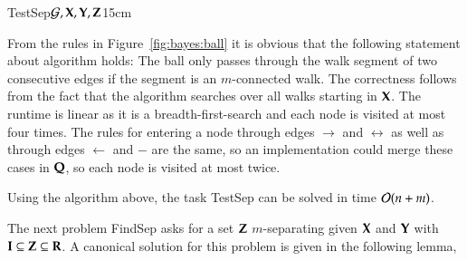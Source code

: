 \begin{algo}{TestSep}{${\cal G}, {\bf X}, {\bf Y}, {\bf Z}$}{\label{algo:issep}}{15cm}
\State{$\bQ \gets \bP$  }
\EndIf
\EndFor
{}
\EndIf
\EndWhile
{}
\end{algo}
\begin{analal}
From the rules in Figure~\ref{fig:bayes:ball} it is obvious that the following statement about algorithm  holds:
%
%
%
The ball only passes through the walk segment of two consecutive edges 
if the segment is an $m$-connected walk. The correctness follows from the fact that 
the algorithm searches over all walks starting in ${\bf X}$.
%
%
%
%
The runtime is linear as it is a breadth-first-search and each node is visited at most four times. The rules for entering a node through edges $\to$ and $\leftrightarrow$ as well as through edges $\gets$ and $-$ are the same, so an implementation could merge these cases in $ {\bf Q} $, so each node is visited at most twice. %
\end{analal}
\begin{proposition}\label{prop:TestSep}
Using the algorithm above, the task {\sc TestSep} can be solved in time ${\cal O}(n+m)$. 
\end{proposition}

The next problem {\sc FindSep} asks for a set ${\bf Z}$ $m$-separating given ${\bf X}$ and ${\bf Y}$ with ${\bf I} \subseteq {\bf Z}\subseteq{\bf R}$. A canonical solution for this problem is given in the following lemma, 

